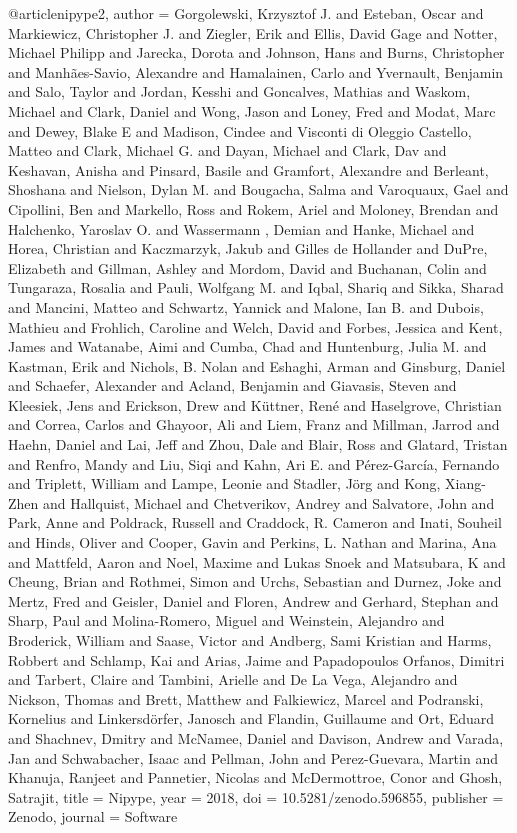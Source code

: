 @article{nipype2,
    author = {Gorgolewski, Krzysztof J. and Esteban, Oscar and Markiewicz, Christopher J. and Ziegler, Erik and Ellis, David Gage and Notter, Michael Philipp and Jarecka, Dorota and Johnson, Hans and Burns, Christopher and Manhães-Savio, Alexandre and Hamalainen, Carlo and Yvernault, Benjamin and Salo, Taylor and Jordan, Kesshi and Goncalves, Mathias and Waskom, Michael and Clark, Daniel and Wong, Jason and Loney, Fred and Modat, Marc and Dewey, Blake E and Madison, Cindee and Visconti di Oleggio Castello, Matteo and Clark, Michael G. and Dayan, Michael and Clark, Dav and Keshavan, Anisha and Pinsard, Basile and Gramfort, Alexandre and Berleant, Shoshana and Nielson, Dylan M. and Bougacha, Salma and Varoquaux, Gael and Cipollini, Ben and Markello, Ross and Rokem, Ariel and Moloney, Brendan and Halchenko, Yaroslav O. and Wassermann , Demian and Hanke, Michael and Horea, Christian and Kaczmarzyk, Jakub and Gilles de Hollander and DuPre, Elizabeth and Gillman, Ashley and Mordom, David and Buchanan, Colin and Tungaraza, Rosalia and Pauli, Wolfgang M. and Iqbal, Shariq and Sikka, Sharad and Mancini, Matteo and Schwartz, Yannick and Malone, Ian B. and Dubois, Mathieu and Frohlich, Caroline and Welch, David and Forbes, Jessica and Kent, James and Watanabe, Aimi and Cumba, Chad and Huntenburg, Julia M. and Kastman, Erik and Nichols, B. Nolan and Eshaghi, Arman and Ginsburg, Daniel and Schaefer, Alexander and Acland, Benjamin and Giavasis, Steven and Kleesiek, Jens and Erickson, Drew and Küttner, René and Haselgrove, Christian and Correa, Carlos and Ghayoor, Ali and Liem, Franz and Millman, Jarrod and Haehn, Daniel and Lai, Jeff and Zhou, Dale and Blair, Ross and Glatard, Tristan and Renfro, Mandy and Liu, Siqi and Kahn, Ari E. and Pérez-García, Fernando and Triplett, William and Lampe, Leonie and Stadler, Jörg and Kong, Xiang-Zhen and Hallquist, Michael and Chetverikov, Andrey and Salvatore, John and Park, Anne and Poldrack, Russell and Craddock, R. Cameron and Inati, Souheil and Hinds, Oliver and Cooper, Gavin and Perkins, L. Nathan and Marina, Ana and Mattfeld, Aaron and Noel, Maxime and Lukas Snoek and Matsubara, K and Cheung, Brian and Rothmei, Simon and Urchs, Sebastian and Durnez, Joke and Mertz, Fred and Geisler, Daniel and Floren, Andrew and Gerhard, Stephan and Sharp, Paul and Molina-Romero, Miguel and Weinstein, Alejandro and Broderick, William and Saase, Victor and Andberg, Sami Kristian and Harms, Robbert and Schlamp, Kai and Arias, Jaime and Papadopoulos Orfanos, Dimitri and Tarbert, Claire and Tambini, Arielle and De La Vega, Alejandro and Nickson, Thomas and Brett, Matthew and Falkiewicz, Marcel and Podranski, Kornelius and Linkersdörfer, Janosch and Flandin, Guillaume and Ort, Eduard and Shachnev, Dmitry and McNamee, Daniel and Davison, Andrew and Varada, Jan and Schwabacher, Isaac and Pellman, John and Perez-Guevara, Martin and Khanuja, Ranjeet and Pannetier, Nicolas and McDermottroe, Conor and Ghosh, Satrajit},
    title = {Nipype},
    year = 2018,
    doi = {10.5281/zenodo.596855},
    publisher = {Zenodo},
    journal = {Software}
}

